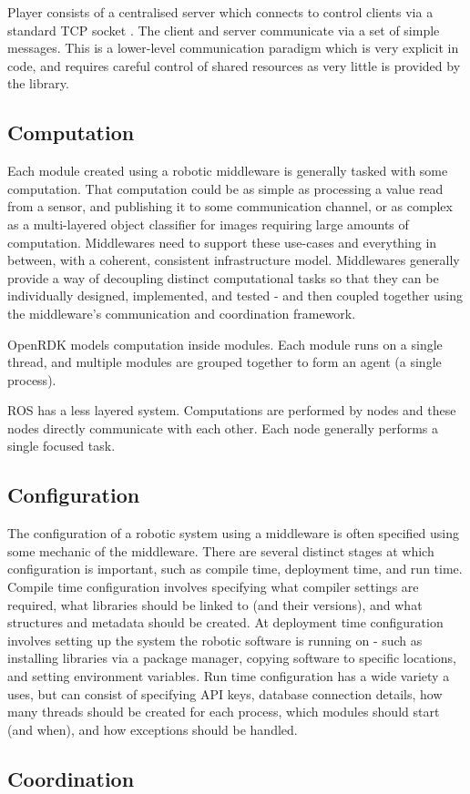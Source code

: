 \documentclass[../dissertation.tex]{subfiles}
\begin{document}
Player consists of a centralised server which connects to control clients via a standard TCP socket \cite{PlayerServerManual}. The client and server communicate via a set of simple messages. This is a lower-level communication paradigm which is very explicit in code, and requires careful control of shared resources as very little is provided by the library.

\subsection{Computation}

Each module created using a robotic middleware is generally tasked with some computation. That computation could be as simple as processing a value read from a sensor, and publishing it to some communication channel, or as complex as a multi-layered object classifier for images requiring large amounts of computation. Middlewares need to support these use-cases and everything in between, with a coherent, consistent infrastructure model. Middlewares generally provide a way of decoupling distinct computational tasks so that they can be individually designed, implemented, and tested - and then coupled together using the middleware's communication and coordination framework.

OpenRDK models computation inside modules. Each module runs on a single thread, and multiple modules are grouped together to form an agent (a single process).

ROS has a less layered system. Computations are performed by nodes and these nodes directly communicate with each other. Each node generally performs a single focused task.

\subsection{Configuration}

The configuration of a robotic system using a middleware is often specified using some mechanic of the middleware. There are several distinct stages at which configuration is important, such as compile time, deployment time, and run time. Compile time configuration involves specifying what compiler settings are required, what libraries should be linked to (and their versions), and what structures and metadata should be created. At deployment time configuration involves setting up the system the robotic software is running on - such as installing libraries via a package manager, copying software to specific locations, and setting environment variables. Run time configuration has a wide variety a uses, but can consist of specifying API keys, database connection details, how many threads should be created for each process, which modules should start (and when), and how exceptions should be handled.



\subsection{Coordination}
\end{document}
